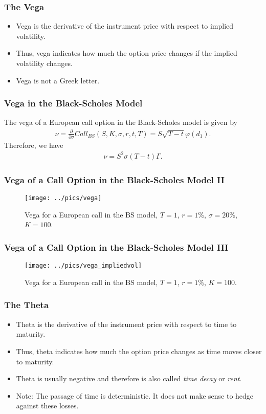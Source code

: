 \begin{frame}[fragile]
\frametitle{The Vega}
\begin{itemize}
  \item Vega is the derivative of the instrument price with respect to
  implied volatility.
  \item Thus, vega indicates how much the option price changes if the implied
  volatility changes.
  \item Vega is not a Greek letter.
\end{itemize}
\end{frame}

\begin{frame}[fragile]
\frametitle{Vega in the Black-Scholes Model}
The vega of a European call option in the Black-Scholes model is given by
\begin{align*}
  \nu = \frac{\partial}{\partial \sigma}Call_{BS}(S,K,\sigma,r,t,T) =
  S\sqrt{T-t} \varphi(d_1).
\end{align*}
Therefore, we have
\begin{align*}
  \nu = S^2 \sigma (T-t) \Gamma.
\end{align*}
\end{frame}

\begin{frame}[fragile]
\frametitle{Vega of a Call Option in the Black-Scholes Model II}
\begin{figure}[htp]
\begin{center}
  \texttt{[image: ../pics/vega]}
  \caption{Vega for a European call in the BS model, $T=1$, $r=1\%$,
  $\sigma=20\%$, $K=100$.}
  \label{fig:vegaBS}
\end{center}
\end{figure}
\end{frame}

\begin{frame}[fragile]
\frametitle{Vega of a Call Option in the Black-Scholes Model III}
\begin{figure}[htp]
\begin{center}
  \texttt{[image: ../pics/vega\_impliedvol]}
  \caption{Vega for a European call in the BS model, $T=1$, $r=1\%$, $K=100$.}
  \label{fig:vega2BS}
\end{center}
\end{figure}
\end{frame}

\begin{frame}[fragile]
\frametitle{The Theta}
\begin{itemize}
  \item Theta is the derivative of the instrument price with respect to
  time to maturity.
  \item Thus, theta indicates how much the option price changes as time moves
  closer to maturity.
  \item Theta is usually negative and therefore is also called \emph{time decay}
  or \emph{rent}.
  \item Note: The passage of time is deterministic. It does not make sense to
  hedge against these losses.
\end{itemize}
\end{frame}


